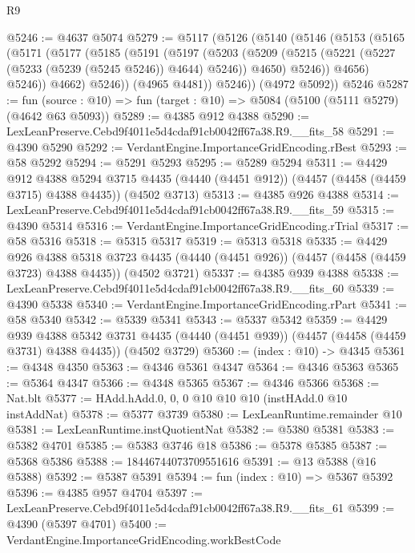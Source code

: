 \begin{lexlean}{R9}
\begin{coremodule}
@5246 := @4637 @5074
@5279 := @5117
    (@5126
      (@5140
        (@5146
          (@5153
            (@5165
              (@5171
                (@5177
                  (@5185
                    (@5191
                      (@5197
                        (@5203
                          (@5209
                            (@5215 (@5221 (@5227 (@5233 (@5239 (@5245 @5246)) @4644) @5246)) @4650)
                            @5246))
                        @4656)
                      @5246))
                  @4662)
                @5246))
            (@4965 @4481))
          @5246))
      (@4972 @5092))
    @5246
@5287 := fun (source : @10) => fun (target : @10) => @5084 (@5100 (@5111 @5279) (@4642 @63 @5093))
@5289 := @4385 @912 @4388
@5290 := LexLeanPreserve.Cebd9f4011e5d4cdaf91cb0042ff67a38.R9.__fits_58
@5291 := @4390 @5290
@5292 := VerdantEngine.ImportanceGridEncoding.rBest
@5293 := @58 @5292
@5294 := @5291 @5293
@5295 := @5289 @5294
@5311 := @4429
    @912
    @4388
    @5294
    @3715
    @4435
    (@4440 (@4451 @912))
    (@4457 (@4458 (@4459 @3715) @4388 @4435))
    (@4502 @3713)
@5313 := @4385 @926 @4388
@5314 := LexLeanPreserve.Cebd9f4011e5d4cdaf91cb0042ff67a38.R9.__fits_59
@5315 := @4390 @5314
@5316 := VerdantEngine.ImportanceGridEncoding.rTrial
@5317 := @58 @5316
@5318 := @5315 @5317
@5319 := @5313 @5318
@5335 := @4429
    @926
    @4388
    @5318
    @3723
    @4435
    (@4440 (@4451 @926))
    (@4457 (@4458 (@4459 @3723) @4388 @4435))
    (@4502 @3721)
@5337 := @4385 @939 @4388
@5338 := LexLeanPreserve.Cebd9f4011e5d4cdaf91cb0042ff67a38.R9.__fits_60
@5339 := @4390 @5338
@5340 := VerdantEngine.ImportanceGridEncoding.rPart
@5341 := @58 @5340
@5342 := @5339 @5341
@5343 := @5337 @5342
@5359 := @4429
    @939
    @4388
    @5342
    @3731
    @4435
    (@4440 (@4451 @939))
    (@4457 (@4458 (@4459 @3731) @4388 @4435))
    (@4502 @3729)
@5360 := (index : @10) -> @4345
@5361 := @4348 @4350
@5363 := @4346 @5361 @4347
@5364 := @4346 @5363
@5365 := @5364 @4347
@5366 := @4348 @5365
@5367 := @4346 @5366
@5368 := Nat.blt
@5377 := HAdd.hAdd.{0, 0, 0} @10 @10 @10 (instHAdd.{0} @10 instAddNat)
@5378 := @5377 @3739
@5380 := LexLeanRuntime.remainder @10
@5381 := LexLeanRuntime.instQuotientNat
@5382 := @5380 @5381
@5383 := @5382 @4701
@5385 := @5383 @3746 @18
@5386 := @5378 @5385
@5387 := @5368 @5386
@5388 := 18446744073709551616
@5391 := @13 @5388 (@16 @5388)
@5392 := @5387 @5391
@5394 := fun (index : @10) => @5367 @5392
@5396 := @4385 @957 @4704
@5397 := LexLeanPreserve.Cebd9f4011e5d4cdaf91cb0042ff67a38.R9.__fits_61
@5399 := @4390 (@5397 @4701)
@5400 := VerdantEngine.ImportanceGridEncoding.workBestCode

\end{coremodule}
\end{lexlean}
